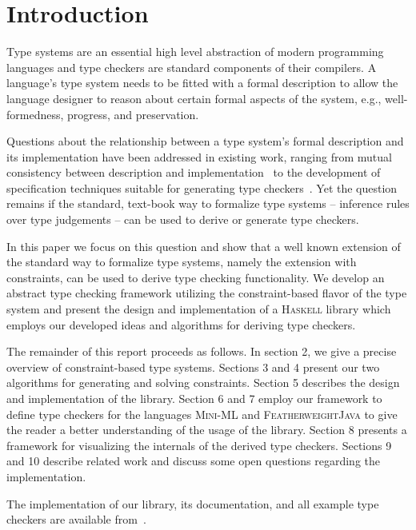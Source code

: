 \section{Introduction}

Type systems are an essential high level abstraction of modern
programming languages and type checkers are standard components of
their compilers. A language's type system needs to be fitted with a
formal description to allow the language designer to reason about
certain formal aspects of the system, e.g., well-formedness, progress,
and preservation.

Questions about the relationship between a type system's formal
description and its implementation have been addressed in existing
work, ranging from mutual consistency between description and
implementation~\cite{Levin2003,Dijkstra2006} to the development of
specification techniques suitable for generating type
checkers~\cite{Gast04}. Yet the question remains if the standard,
text-book way to formalize type systems -- inference rules over type
judgements -- can be used to derive or generate type checkers.

In this paper we focus on this question and show that a well known
extension of the standard way to formalize type systems, namely the
extension with constraints, can be used to derive type checking
functionality. We develop an abstract type checking framework
utilizing the constraint-based flavor of the type system and present
the design and implementation of a \textsc{Haskell} library which
employs our developed ideas and algorithms for deriving type checkers.

The remainder of this report proceeds as follows. In section 2, we
give a precise overview of constraint-based type systems. Sections 3
and 4 present our two algorithms for generating and solving
constraints. Section 5 describes the design and implementation of the
library. Section 6 and 7 employ our framework to define type checkers
for the languages \textsc{Mini-ML} and \textsc{FeatherweightJava} to
give the reader a better understanding of the usage of the
library. Section 8 presents a framework for visualizing the internals
of the derived type checkers. Sections 9 and 10 describe related work
and discuss some open questions regarding the implementation.

The implementation of our library, its documentation, and all example
type checkers are available from~\cite{TypeCheckLib}.
